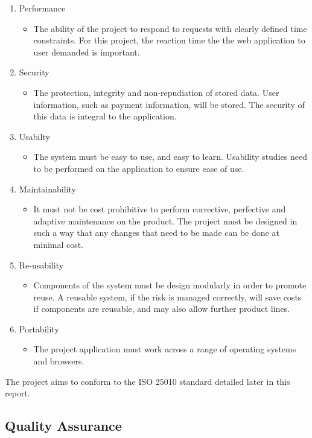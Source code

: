 \begin{enumerate}
\item Performance
\begin{itemize}
\item The ability of the project to respond to requests with clearly defined time constraints. For this project, the reaction time the the web application to user demanded is important.
\end{itemize}
\item Security
\begin{itemize}
\item The protection, integrity and non-repudiation of stored data. User information, such as payment information, will be stored. The security of this data is integral to the application.
\end{itemize}
\item Usabilty
\begin{itemize}
\item The system must be easy to use, and easy to learn. Usability studies need to be performed on the application to ensure ease of use.
\end{itemize}
\item Maintainability
\begin{itemize}
\item It must not be cost prohibitive to perform corrective, perfective and adaptive maintenance on the product. The project must be designed in such a way that any changes that need to be made can be done at minimal cost. 
\end{itemize}
\item Re-usability
\begin{itemize}
\item Components of the system must be design modularly in order to promote reuse. A reusable system, if the risk is managed correctly, will save costs if components are reusable, and may also allow further product lines.
\end{itemize}
\item Portability
\begin{itemize}
\item The project application must work across a range of operating systems and browsers.
\end{itemize}
\end{enumerate}

The project aims to conform to the ISO 25010 standard detailed later in this report.

\subsection{Quality Assurance}

